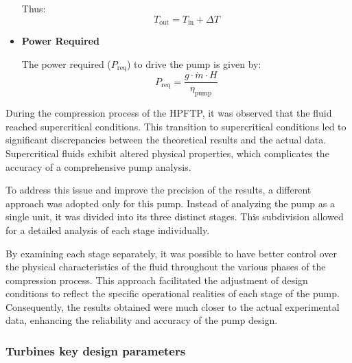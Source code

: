 \begin{itemize}
Thus:
\[
T_{\text{out}} = T_{\text{in}} + \Delta T
\]

\item\textbf{Power Required}

The power required (\(P_{\text{req}}\)) to drive the pump is given by:
\[
P_{\text{req}} = \frac{g \cdot \dot{m} \cdot H}{\eta_{\text{pump}}}
\]

\end{itemize}

During the compression process of the HPFTP, it was observed that the fluid reached supercritical conditions. This transition to supercritical conditions led to significant discrepancies between the theoretical results and the actual data. Supercritical fluids exhibit altered physical properties, which complicates the accuracy of a comprehensive pump analysis.

To address this issue and improve the precision of the results, a different approach was adopted only for this pump. Instead of analyzing the pump as a single unit, it was divided into its three distinct stages. This subdivision allowed for a detailed analysis of each stage individually.

By examining each stage separately, it was possible to have better control over the physical characteristics of the fluid throughout the various phases of the compression process. This approach facilitated the adjustment of design conditions to reflect the specific operational realities of each stage of the pump. Consequently, the results obtained were much closer to the actual experimental data, enhancing the reliability and accuracy of the pump design.

\subsubsection{Turbines key design parameters}

